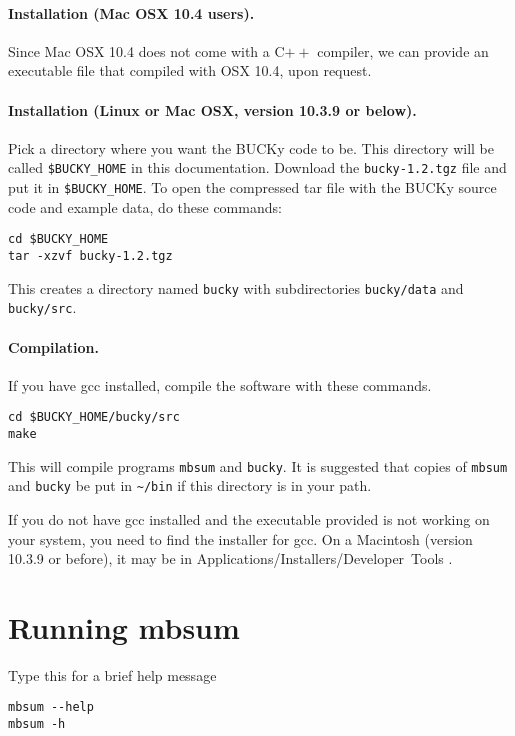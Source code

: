 \documentclass[12pt,english,final,letterpaper]{article}
\newcommand{\bu}{BUCKy}
\begin{document}
\paragraph{Installation (Mac OSX 10.4 users).}
Since Mac OSX 10.4 does not come with a C$++$ compiler, we can provide 
an executable file that compiled with OSX 10.4, upon request. 


\paragraph{Installation (Linux or Mac OSX, version 10.3.9 or below).}
Pick a directory where you want the \bu{} code to be. This directory 
will be called \verb+$BUCKY_HOME+ in this documentation.
Download the {\tt bucky-1.2.tgz} file and put it in \verb+$BUCKY_HOME+.
To open the compressed tar file with the \bu{} source code 
and example data, do these commands:
\begin{verbatim}
cd $BUCKY_HOME
tar -xzvf bucky-1.2.tgz
\end{verbatim}              %
This creates a directory named {\tt bucky} with subdirectories
{\tt bucky/data} and {\tt bucky/src}.

\paragraph{Compilation.} If you have gcc installed, compile
the software with these commands.
\begin{verbatim}
cd $BUCKY_HOME/bucky/src
make
\end{verbatim}   %
This will compile programs {\tt mbsum} and {\tt bucky}.
It is suggested that copies of {\tt mbsum} and {\tt bucky}
be put in \verb+~/bin+ if this directory is in your path.

If you do not have gcc installed and the executable provided
is not working on your system, you need to find the installer
for gcc. On a Macintosh (version 10.3.9 or before), it may be in 
Applications/Installers/Developer~Tools .

\section{Running mbsum}
Type this for a brief help message
\begin{verbatim}
mbsum --help
mbsum -h
\end{verbatim}
\end{document}
